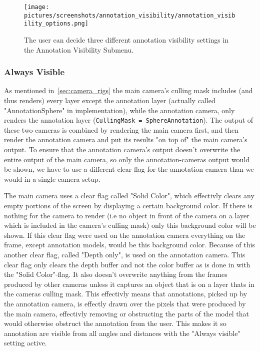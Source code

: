 \begin{figure}%
	\texttt{[image: pictures/screenshots/annotation\_visibility/annotation\_visibility\_options.png]}
	\caption[The Annotation Visibility Submenu]{The user can decide three different annotation visibility settings in the Annotation Visibility Submenu.}
	\label{fig:annotation_visibility_options}
\end{figure} 

\subsubsection{Always Visible}
As mentioned in~\vref{sec:camera_rigs} the main camera's culling mask includes (and thus renders) every layer except the 
annotation layer (actually called "AnnotationSphere" in implementation), while the annotation camera, only renders
the annotation layer (\texttt{CullingMask = {SphereAnnotation}}). The output of these two cameras is combined by rendering the main camera first, and
then render the annotation camera and put its results "on top of" the main camera's output.
To ensure that the annotation camera's output doesn't overwrite the entire output of the main camera,
so only the annotation-cameras output would be shown, we have to use a different clear flag for the annotation camera than we would in a single-camera setup. 

The main camera uses a clear flag called "Solid Color", which
effectivly clears any empty portions of the screen by displaying a certain background color. 
If there is nothing for the camera to render (i.e no object in front of the camera on a layer which is included in the camera's culling mask) only this background color 
will be shown. If this clear flag were used on the annotation camera everything on the frame, except annotation models, would be this background color. 
Because of this another clear flag, called "Depth only", is used on the annotation camera. This clear flag only clears the depth buffer and not the color buffer as is done 
in with the "Solid Color"-flag. It also doesn't overwrite anything from the frames produced by other cameras 
unless it captures an object that is on a layer thats in the cameras culling mask. This effectivly means that annotations, picked up by the annotation camera, is effectly drawn
over the pixels that were produced by the main camera, effectivly removing or obstructing the parts of the model that would otherwise obstruct the annotation from the user.
This makes it so annotation are visible from all angles and distances with the "Always visible" setting active. 

